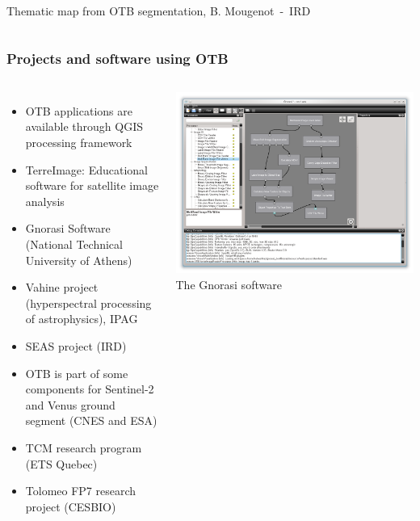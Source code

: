 \documentclass[8pt]{beamer}
\begin{document}
\begin{frame}
\begin{columns}
\tiny{Thematic map from OTB segmentation, B. Mougenot~-~IRD}
\end{columns}
\end{frame}

\begin{frame}
\frametitle{Projects and software using OTB}
\begin{columns}
  \begin{itemize}
    \item OTB applications are available through QGIS processing framework
    \item TerreImage: Educational software for satellite image analysis
    \item Gnorasi Software (National Technical University of Athens)
    \item Vahine project (hyperspectral processing of astrophysics), IPAG
    \item SEAS project (IRD)
    \item OTB is part of some components for Sentinel-2 and Venus ground segment (CNES and ESA)
    \item TCM research program (ETS Quebec)
    \item Tolomeo FP7 research project (CESBIO)
  \end{itemize}
  \includegraphics[width=\textwidth]{images/gnorasi2.png}\\
  \tiny{The Gnorasi software}
\end{columns}
\end{frame}
\end{document}
